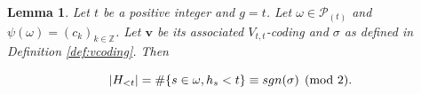\documentclass[11pt,letterpaper]{amsart}
\def\bbbz{\mathbb Z}
\def\ccdd{\mathcal {DD}}
\def\ccp{\mathcal P}
\def\sgn{{\rm sgn}}
\newtheorem{lm}[df]{Lemma}
\numberwithin{equation}{section}
\numberwithin{df}{section}
\begin{document}
\begin{lm}\label{lem:signschurA}
Let $t$ be a positive integer and $g=t$.
Let $\omega\in\ccp_{(t)}$ and $\psi(\omega)=(c_k)_{k\in\bbbz}$. 
Let $\mathbf{v}$ be its associated $V_{t,t}$-coding and $\sigma$ as defined in Definition \ref{def:vcoding}. Then

\begin{equation}
\lvert H_{<t}\rvert=\#\lbrace s\in\omega, h_s<t\rbrace\equiv \sgn(\sigma)\pmod{2}.
\end{equation}
\end{lm}
\end{document}
